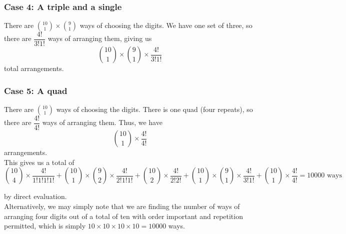 \documentclass[a4paper,11pt]{article}
\begin{document}
\subsubsection*{Case 4: A triple and a single}
There are $\binom{10}{1}\times\binom{9}{1}$ ways of choosing the digits. We have one set of three, so there are $\dfrac{4!}{3!1!}$ ways of arranging them, giving us
$$
\binom{10}{1}\times\binom{9}{1}\times\frac{4!}{3!1!}
$$
total arrangements.

\subsubsection*{Case 5: A quad}
There are $\binom{10}{1}$ ways of choosing the digits. There is one quad (four repeats), so there are $\dfrac{4!}{4!}$ ways of arranging them. Thus, we have
$$
\binom{10}{1}\times\frac{4!}{4!}
$$
arrangements.\\

\noindent This gives us a total of
$$
\binom{10}{4}\times\frac{4!}{1!1!1!1!} + \binom{10}{1}\times\binom{9}{2}\times\dfrac{4!}{2!1!1!} + \binom{10}{2}\times\frac{4!}{2!2!} + \binom{10}{1}\times\binom{9}{1}\times\frac{4!}{3!1!} + \binom{10}{1}\times\frac{4!}{4!} = 10000\text{ ways}
$$

\noindent by direct evaluation.\\

\noindent Alternatively, we may simply note that we are finding the number of ways of arranging four digits out of a total of ten with order important and repetition permitted, which is simply $10\times10\times10\times10 = 10000$ ways.\\
\end{document}
